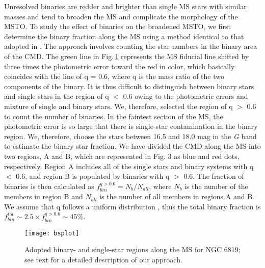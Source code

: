 \documentclass[twocolumn]{aastex631}
\begin{document}
Unresolved binaries are redder and brighter than single MS stars with similar masses and tend to broaden the MS and complicate the morphology of the MSTO. To study the effect of binaries on the broadened MSTO, we first determine the binary fraction along the MS using a method identical to that adopted in \citet{2012A&A...540A..16M}. The approach involves counting the star numbers in the binary area of the CMD. The green line in Fig.\,\ref{fig:bsplot} represents the MS fiducial line shifted by three times the photometric error toward the red in color, which basically coincides with the line of q = 0.6, where q is the mass ratio of the two components of the binary. It is thus difficult to distinguish between binary stars and single stars in the region of q $<$ 0.6 owing to the photometric errors and mixture of single and binary stars. We, therefore, selected the region of q $>$ 0.6 to count the number of binaries. In the faintest section of the MS, the photometric error is so large that there is single-star contamination in the binary region. We, therefore, choose the stars between 16.5 and 18.0 mag in the \textit{G} band to estimate the binary star fraction. We have divided the CMD along the MS into two regions, A and B, which are represented in Fig. 3 as blue and red dots, respectively.  Region A includes all of the single stars and binary systems with q $<$ 0.6, and region B is populated by binaries with q $>$ 0.6. The fraction of binaries is then calculated as $f_{bin}^{q>0.6}={N_{b}}/{N_{all}}$, where $ N_{b}$ is the number of the members in region B and $ N_{all}$ is the number of all members in regions A and B. We assume that q follows a uniform distribution \citep[e.g. ][]{2012A&A...540A..16M, 2016MNRAS.455.3009M, cordoni2018extended}, thus the total binary fraction is $f_{bin}^{tot} \sim 2.5 \times f_{bin}^{q>0.6} \sim 45\%$.
\begin{figure}
	\centering
	\texttt{[image: bsplot]}
	\caption{Adopted binary- and single-star regions along the MS for NGC 6819; see text for a detailed description of our approach. }
	\label{fig:bsplot}
\end{figure}
\end{document}
